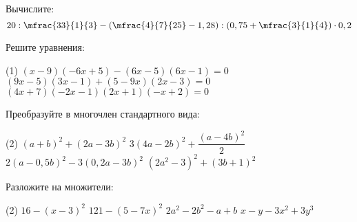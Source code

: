 \begin{exam}
	\begin{listofex}
		\item Вычислите:
		\[ 20 : \mfrac{33}{1}{3} - \left( \mfrac{4}{7}{25} - 1,28 \right) : \left( 0,75 + \mfrac{3}{1}{4} \right) \cdot 0,2 \]
		\item Решите уравнения:
		\begin{tasks}(1)
			\task \( (x-9)(-6x+5)-(6x-5)(6x-1)=0 \)
			\task \( (9x-5)(3x-1)+(5-9x)(2x-3)=0 \)
			\task \( (4x+7)(-2x-1)(2x+1)(-x+2)=0 \)
		\end{tasks}
		\item Преобразуйте в многочлен стандартного вида:
		\begin{tasks}(2)
			\task \( (a+b)^2+(2a-3b)^2 \)
			\task \( 3(4a-2b)^2+\dfrac{(a-4b)^2}{2} \)
			\task \( 2(a-0,5b)^2-3(0,2a-3b)^2 \)
			\task \( (2a^2-3)^2+(3b+1)^2 \)
		\end{tasks}
		\item Разложите на множители:
		\begin{tasks}(2)
			\task \(16-(x-3)^2\)
			\task \(121-(5-7x)^2\)
			\task \( 2a^2-2b^2-a+b \)
			\task \( x-y-3x^2+3y^3 \)
		\end{tasks}
	\end{listofex}
\end{exam}

